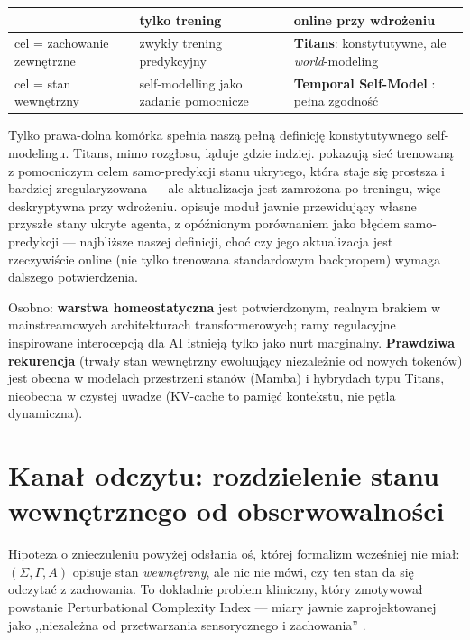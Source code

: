 \documentclass[11pt]{article}
\begin{document}
\begin{center}
\small
\begin{tabular}{@{}>{\raggedright}p{2.6cm}>{\raggedright}p{4.5cm}>{\raggedright\arraybackslash}p{4.5cm}@{}}
\toprule
 & \textbf{tylko trening} & \textbf{online przy wdrożeniu} \\
\midrule
cel = zachowanie zewnętrzne & zwykły trening predykcyjny & \textbf{Titans}: konstytutywne, ale \emph{world}-modeling \\[4pt]
cel = stan wewnętrzny & self-modelling jako zadanie pomocnicze \cite{premakumar2026} & \textbf{Temporal Self-Model} \cite{tsm2026}: pełna zgodność \\
\bottomrule
\end{tabular}
\end{center}
Tylko prawa-dolna komórka spełnia naszą pełną definicję konstytutywnego self-modelingu. Titans, mimo rozgłosu, ląduje gdzie indziej. \cite{premakumar2026} pokazują sieć trenowaną z pomocniczym celem samo-predykcji stanu ukrytego, która staje się prostsza i bardziej zregularyzowana --- ale aktualizacja jest zamrożona po treningu, więc deskryptywna przy wdrożeniu. \cite{tsm2026} opisuje moduł jawnie przewidujący własne przyszłe stany ukryte agenta, z opóźnionym porównaniem jako błędem samo-predykcji --- najbliższe naszej definicji, choć czy jego aktualizacja jest rzeczywiście online (nie tylko trenowana standardowym backpropem) wymaga dalszego potwierdzenia.

Osobno: \textbf{warstwa homeostatyczna} jest potwierdzonym, realnym brakiem w mainstreamowych architekturach transformerowych; ramy regulacyjne inspirowane interocepcją dla AI \cite{interoceptive2026} istnieją tylko jako nurt marginalny. \textbf{Prawdziwa rekurencja} (trwały stan wewnętrzny ewoluujący niezależnie od nowych tokenów) jest obecna w modelach przestrzeni stanów (Mamba) i hybrydach typu Titans, nieobecna w czystej uwadze (KV-cache to pamięć kontekstu, nie pętla dynamiczna).

\section{Kanał odczytu: rozdzielenie stanu wewnętrznego od obserwowalności}\label{sec:readout}

Hipoteza o znieczuleniu powyżej odsłania oś, której formalizm wcześniej nie miał: $(\Sigma,\Gamma,A)$ opisuje stan \emph{wewnętrzny}, ale nic nie mówi, czy ten stan da się odczytać z zachowania. To dokładnie problem kliniczny, który zmotywował powstanie Perturbational Complexity Index --- miary jawnie zaprojektowanej jako ,,niezależna od przetwarzania sensorycznego i zachowania'' \cite{casali2013}.
\end{document}

